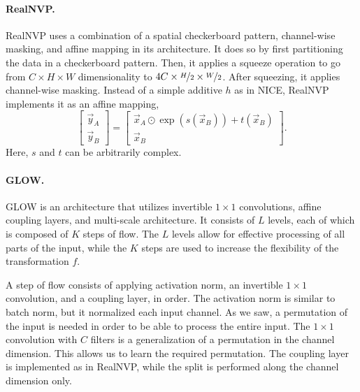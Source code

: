 \paragraph{RealNVP.} RealNVP \citep{dinh2016density} uses a combination of a spatial checkerboard pattern, channel-wise
masking, and affine mapping in its architecture. It does so by first partitioning the data in a
checkerboard pattern. Then, it applies a squeeze operation to go from $C \times H \times W$
dimensionality to $4C \times \nicefrac{H}{2} \times \nicefrac{W}{2}$. After squeezing, it applies
channel-wise masking. Instead of a simple additive $h$ as in NICE, RealNVP implements it as an
affine mapping, \[
    \begin{bmatrix} \vec{y}_A \\ \vec{y}_B \end{bmatrix} = \begin{bmatrix} \vec{x}_A \odot \exp(s(\vec{x}_B)) + t(\vec{x}_B) \\ \vec{x}_B \end{bmatrix}.
\]
Here, $s$ and $t$ can be arbitrarily complex.

\paragraph{GLOW.} GLOW \citep{kingma2018glow} is an architecture that utilizes invertible $1 \times 1$ convolutions,
affine coupling layers, and multi-scale architecture. It consists of $L$ levels, each of which is
composed of $K$ steps of flow. The $L$ levels allow for effective processing of all parts of the
input, while the $K$ steps are used to increase the flexibility of the transformation $f$.

A step of flow consists of applying activation norm, an invertible $1 \times 1$ convolution, and a
coupling layer, in order. The activation norm is similar to batch norm, but it normalized each
input channel. As we saw, a permutation of the input is needed in order to be able to process the
entire input. The $1 \times 1$ convolution with $C$ filters is a generalization of a permutation in
the channel dimension. This allows us to learn the required permutation. The coupling layer is
implemented as in RealNVP, while the split is performed along the channel dimension only.
